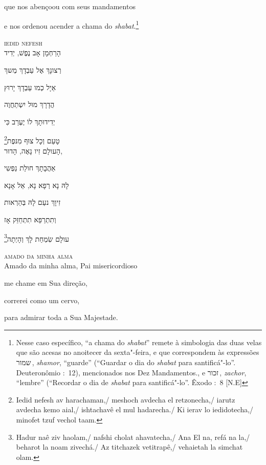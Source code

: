 que nos abençoou com seus mandamentos\label{ref01}

e nos ordenou acender a chama do \textit{shabat}.\footnote{Nesse caso 
	específico, ``a chama do \textit{shabat}'' remete à simbologia das duas velas
	que são acesas no anoitecer da sexta"-feira, e que correspondem às
	expressões שמור\,, \emph{shamor}, ``guarde'' (``Guardar o dia do
	\emph{shabat} para santificá"-lo''. Deuteronômio :~12),
	mencionados nos Dez Mandamentos., e זכור\,, \emph{zachor}, ``lembre''
	(``Recordar o dia de \emph{shabat} para santificá"-lo''. Êxodo
	:~8 [N.E]}

\movetoevenpage
\raggedleft


\textsc{iedid nefesh}\\[15pt]

הָרַחְמָן אָב נֶפֶשׁ, יְדִיד 

רְצונָךְ אֶל עַבְדָךְ מְשךְ 

אַיָל כְמו עַבְדָךְ יָרוּץ 

הֲדָרָךְ מוּל יִשְתַחֲוֶה 

יְדִידוּתָךְ לוֹ יֶעְרַב כִּי 

\footnote{Iedid nefesh av harachaman,/ meshoch avdecha el retzonecha,/ iarutz avdecha kemo aial,/ ishtachavê el mul hadarecha./ Ki ierav lo iedidotecha,/ minofet tzuf vechol taam.}טָעַם וְכָל צוּף מִנּפֶת\\[10pt]

הָעולָם זִיו נָאֶה, הָדוּר,

אַהֲבָתָךְ חולַת נַפְשִי 

לָהּ נָא רְפָא נָא, אֵל אָנָא 

זִיוָךְ נעַם לָהּ בְּהַרְאות

וְתִתְרַפֵּא תִתְחֵזֵּק אָז

\footnote{Hadur naê ziv haolam,/ nafshi cholat ahavatecha,/ Ana El na, refá na la,/ beharot la noam zivechá./ Az titchazek vetitrapê,/ vehaietah la simchat olam.}עולָם שִׂמְחַת לָךְ וְהָיְתָה\\[10pt]


\movetooddpage
\raggedright

\textsc{amado da minha alma}\\[15pt]

{Amado da minha alma}, Pai misericordioso

me chame em Sua direção,

correrei como um cervo,

para admirar toda a Sua Majestade.

